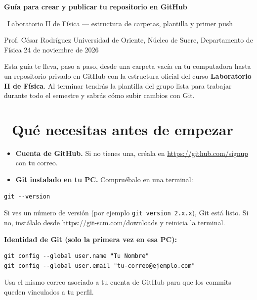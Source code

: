 \documentclass[11pt,a4paper]{article}
\newcommand{\iconoBanda}{microchip}
\newcommand{\bandaTitulo}[3][fondoOscuro]{%
  \begin{tcolorbox}[
    enhanced, colback=#1, colframe=#1, boxrule=0pt, arc=8pt, outer arc=8pt,
    width=\linewidth, top=18pt, bottom=6pt, left=14pt, right=14pt,
    borderline south={3.5pt}{0pt}{cyanNeon},
  ]
    \begin{minipage}[c]{0.07\linewidth}
      \centering
      \textcolor{cyanNeon}{\fontsize{30}{30}\selectfont\faIcon{\iconoBanda}}
    \end{minipage}%
    \hspace{8pt}%
    \begin{minipage}[c]{0.88\linewidth}
      {\fontsize{20}{24}\selectfont\bfseries\color{white}#2}\par\vspace{5pt}%
      \textcolor{cyanNeon!80!white}{\small\faIcon{angle-right}~#3}%
    \end{minipage}
    \vspace{4pt}
  \end{tcolorbox}%
  \vspace{8pt}%
}
\newcommand{\iconotexto}[2]{\textcolor{cyanNeon}{\faIcon{#1}}~#2}
\renewcommand{\iconoBanda}{atom}
\begin{document}
\bandaTitulo[fondoOscuro]{Guía para crear y publicar tu repositorio en GitHub}{Laboratorio II de Física --- estructura de carpetas, plantilla y primer push}

\begin{center}\small\color{grisTexto}Prof. César Rodríguez \textbar{} Universidad de Oriente, Núcleo de Sucre, Departamento de Física \textbar{} 24 de noviembre de 2026\end{center}

\begin{tcolorbox}[tarjetaDato,title={\faIcon{bullseye}~Objetivo de esta guía}]
Esta guía te lleva, paso a paso, desde una carpeta vacía en tu computadora hasta un repositorio privado en GitHub con la estructura oficial del curso \textbf{Laboratorio II de Física}. Al terminar tendrás la plantilla del grupo lista para trabajar durante todo el semestre y sabrás cómo subir cambios con Git.
\end{tcolorbox}

\section{\iconotexto{toolbox}{Qué necesitas antes de empezar}}

\begin{tcolorbox}[tarjetaIcono,title={\faIcon{check-circle}~Requisitos mínimos}]
\begin{itemize}[leftmargin=1.4em,itemsep=3pt,topsep=2pt]
  \item \textbf{Cuenta de GitHub.} Si no tienes una, créala en \url{https://github.com/signup} con tu correo.
  \item \textbf{Git instalado en tu PC.} Compruébalo en una terminal:
\end{itemize}
\begin{lstlisting}
git --version
\end{lstlisting}
Si ves un número de versión (por ejemplo \texttt{git version 2.x.x}), Git está listo. Si no, instálalo desde \url{https://git-scm.com/downloads} y reinicia la terminal.
\begin{tcolorbox}[cajaContenido]
\textbf{Identidad de Git (solo la primera vez en esa PC):}
\begin{lstlisting}
git config --global user.name "Tu Nombre"
git config --global user.email "tu-correo@ejemplo.com"
\end{lstlisting}
Usa el mismo correo asociado a tu cuenta de GitHub para que los commits queden vinculados a tu perfil.
\end{tcolorbox}
\end{tcolorbox}
\end{document}

